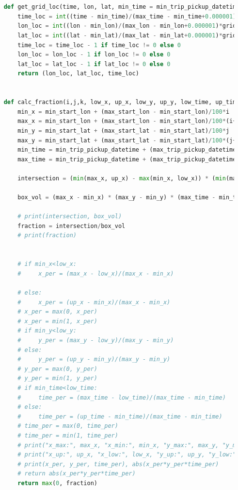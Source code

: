 \documentclass{article}
\begin{document}
\begin{lstlisting}[language=Python, caption=Task 2, label=task2, breaklines=true]
    
    
    def get_grid_loc(time, lon, lat, min_time = min_trip_pickup_datetime, max_time = max_trip_pickup_datetime, min_lon = min_start_lon, max_lon = max_start_lon, min_lat = min_start_lat, max_lat = max_start_lat, grid_size = 100):
        time_loc = int((time - min_time)/(max_time - min_time+0.000001)*grid_size)
        lon_loc = int((lon - min_lon)/(max_lon - min_lon+0.000001)*grid_size)
        lat_loc = int((lat - min_lat)/(max_lat - min_lat+0.000001)*grid_size)
        time_loc = time_loc - 1 if time_loc != 0 else 0
        lon_loc = lon_loc - 1 if lon_loc != 0 else 0
        lat_loc = lat_loc - 1 if lat_loc != 0 else 0
        return (lon_loc, lat_loc, time_loc)
    
    
    def calc_fraction(i,j,k, low_x, up_x, low_y, up_y, low_time, up_time,):
        min_x = min_start_lon + (max_start_lon - min_start_lon)/100*i
        max_x = min_start_lon + (max_start_lon - min_start_lon)/100*(i+1)
        min_y = min_start_lat + (max_start_lat - min_start_lat)/100*j
        max_y = min_start_lat + (max_start_lat - min_start_lat)/100*(j+1)
        min_time = min_trip_pickup_datetime + (max_trip_pickup_datetime - min_trip_pickup_datetime)/100*k
        max_time = min_trip_pickup_datetime + (max_trip_pickup_datetime - min_trip_pickup_datetime)/100*(k+1)
        
        intersection = (min(max_x, up_x) - max(min_x, low_x)) * (min(max_y, up_y) - max(min_y, low_y)) * (min(max_time, up_time) - max(min_time, low_time))
        
        box_vol = (max_x - min_x) * (max_y - min_y) * (max_time - min_time)
        
        # print(intersection, box_vol)
        fraction = intersection/box_vol
        # print(fraction)
        
        
        # if min_x<low_x:
        #     x_per = (max_x - low_x)/(max_x - min_x)
    
        # else:
        #     x_per = (up_x - min_x)/(max_x - min_x)
        # x_per = max(0, x_per)
        # x_per = min(1, x_per)
        # if min_y<low_y:
        #     y_per = (max_y - low_y)/(max_y - min_y)
        # else:
        #     y_per = (up_y - min_y)/(max_y - min_y)
        # y_per = max(0, y_per)
        # y_per = min(1, y_per)
        # if min_time<low_time:
        #     time_per = (max_time - low_time)/(max_time - min_time)
        # else:
        #     time_per = (up_time - min_time)/(max_time - min_time)
        # time_per = max(0, time_per)
        # time_per = min(1, time_per)
        # print("x_max:", max_x, "x_min:", min_x, "y_max:", max_y, "y_min:", min_y, "time_max:", max_time, "time_min:", min_time)
        # print("x_up:", up_x, "x_low:", low_x, "y_up:", up_y, "y_low:", low_y, "time_up:", up_time, "time_low:", low_time)
        # print(x_per, y_per, time_per), abs(x_per*y_per*time_per)
        # return abs(x_per*y_per*time_per)
        return max(0, fraction)
    

\end{lstlisting}
\end{document}
